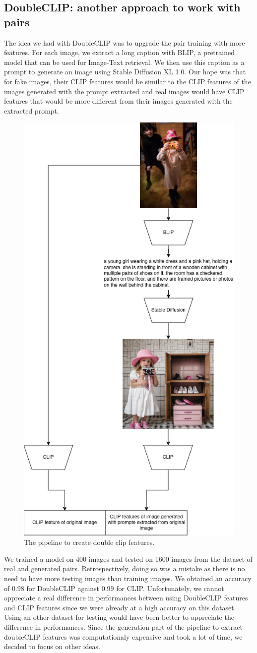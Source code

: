 \documentclass[12pt,a4paper]{article}
\begin{document}
\subsection{DoubleCLIP: another approach to work with pairs}
The idea we had with DoubleCLIP was to upgrade the pair training with more features. For each image, we extract a long caption with BLIP, a pretrained model that can be used for Image-Text retrieval. We then use this caption as a prompt to generate an image using Stable Diffusion XL 1.0. Our hope was that for fake images, their CLIP features would be similar to the CLIP features of the images generated with the prompt extracted and real images would have CLIP features that would be more different from their images generated with the extracted prompt. 
\begin{figure}[H]
    \centering
    \includegraphics[width=.45\textwidth]{img/double_clip.png}
    \caption{The pipeline to create double clip features.}
\end{figure}
We trained a model on 400 images and tested on 1600 images from the dataset of real and generated pairs. Retrospectively, doing so was a mistake as there is no need to have more testing images than training images. We obtained an accuracy of 0.98 for DoubleCLIP against 0.99 for CLIP. Unfortunately, we cannot appreciate a real difference in performances between using DoubleCLIP features and CLIP features since we were already at a high accuracy on this dataset. Using an other dataset for testing would have been better to appreciate the difference in performances. Since the generation part of the pipeline to extract doubleCLIP features was computationaly expensive and took a lot of time, we decided to focus on other ideas.
\end{document}
